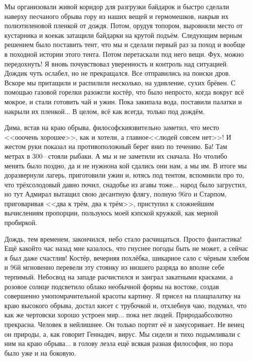 Мы организовали живой коридор для разгрузки байдарок и быстро сделали наверху песчаного обрыва гору из наших вещей и гермомешков, накрыв их полиэтиленовой пленкой от дождя. Потом, орудуя топором, выровняли место от кустарника и кое\sdash как затащили байдарки на крутой подъём. Следующим верным решением было поставить тент, что мы и сделали первый раз за поход и вообще в походной истории этого тента. Потом перетаскали под него вещи. Фух, можно передохнуть! Я вновь почувствовал уверенность и контроль над ситуацией. Дождик чуть ослабел, но не прекращался. Все отправились на поиски дров. Вскоре мы притащили и распилили несколько, на удивление, сухих брёвен. С помощью газовой горелки разожгли костёр, что было непросто, когда вокруг всё мокрое, и стали готовить чай и ужин. Пока закипала вода, поставили палатки и накрыли их пленкой$\ldots$ В целом, всё как всегда, только под дождём. 

Дима, встав на краю обрыва, философски\sdash язвительно заметил, что место <<о\sdash о\sdash очень хорошее>>, как и хотели, а главное\mdash <<людей совсем нет>>! И жестом руки показал на противоположный берег вниз по течению. Ба! Там метрах в 300\thinspace\nobreakdash-- стояли рыбаки. А мы и не заметили их сначала. Но что\sdash либо менять было поздно, да и не нужно\mdash на кой сдались они нам, а мы им. В итоге мы доразвернули лагерь, приготовили ужин и, ютясь под тентом, вспомнили про то, что трёхсолодовый давно почил, снадобье из агавы тоже$\ldots$ народ было загрустил, но тут Адмирал вытащил свою десантную флягу, полную 96\sdash го и Старпом, приговаривая <<два к трём, два к трём>>, приступил к сложнейшим вычислениям пропорции, пользуюсь моей кэпской кружкой, как мерной пробиркой. 

Дождь, тем временем, закончился, небо стало расчищаться. Просто фантастика! Ещё какой\sdash то час назад мне казалось, что гнуснее погоды быть не может, а сейчас я был даже счастлив! Костёр, вечерняя похлёбка, шикарное сало с чёрным хлебом и 96\sdash й мгновенно перевели эту стоянку из низшего разряда во вполне себе терпимый. Небосвод на западе расчистился и заиграл закатными красками, а розовое солнце подсветило облако необычной формы на востоке, создав совершенно умопомрачительной красоты картину. Я присел на плащ\sdash палатку на краю высокого обрыва, достал кисет с трубочкой и, отхлебнув чаю, подумал, что как же чертовски хорошо устроен мир$\ldots$ пока нет людей. Природа\mdash абсолютно прекрасна. Человек в ней\mdash лишнее. Он только портит её и замусоривает. Не венец он природы, а, как говорит Геннадич, вирус. Мы сидели и тихо подымливали с ним на краю обрыва$\ldots$ в голову лезла ещё всякая разная философия, но пора было уже и на боковую. 

